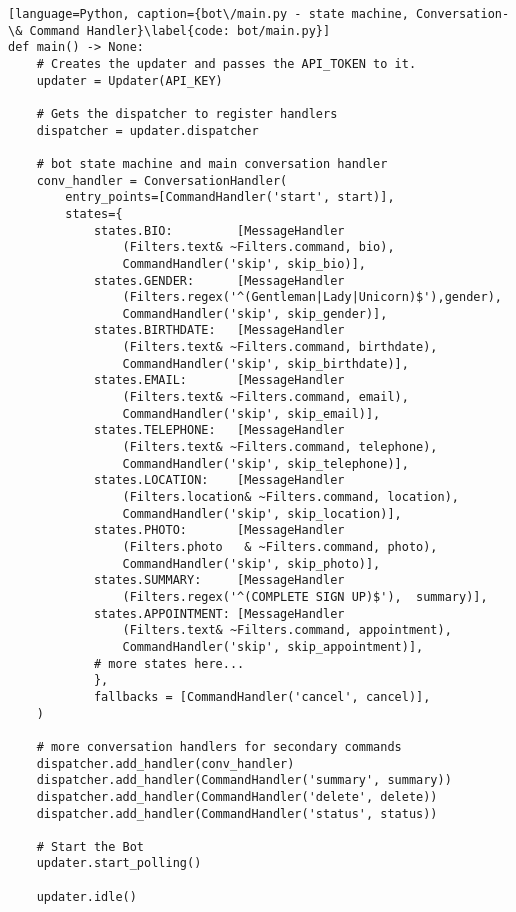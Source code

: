         \begin{lstlisting}[language=Python, caption={bot\/main.py - state machine, Conversation- \& Command Handler}\label{code: bot/main.py}]
def main() -> None:
    # Creates the updater and passes the API_TOKEN to it.
    updater = Updater(API_KEY)

    # Gets the dispatcher to register handlers
    dispatcher = updater.dispatcher

    # bot state machine and main conversation handler
    conv_handler = ConversationHandler(
        entry_points=[CommandHandler('start', start)],
        states={
            states.BIO:         [MessageHandler
                (Filters.text& ~Filters.command, bio), 
                CommandHandler('skip', skip_bio)],
            states.GENDER:      [MessageHandler
                (Filters.regex('^(Gentleman|Lady|Unicorn)$'),gender), 
                CommandHandler('skip', skip_gender)],
            states.BIRTHDATE:   [MessageHandler
                (Filters.text& ~Filters.command, birthdate), 
                CommandHandler('skip', skip_birthdate)],
            states.EMAIL:       [MessageHandler
                (Filters.text& ~Filters.command, email), 
                CommandHandler('skip', skip_email)],
            states.TELEPHONE:   [MessageHandler
                (Filters.text& ~Filters.command, telephone), 
                CommandHandler('skip', skip_telephone)],
            states.LOCATION:    [MessageHandler
                (Filters.location& ~Filters.command, location), 
                CommandHandler('skip', skip_location)],
            states.PHOTO:       [MessageHandler
                (Filters.photo   & ~Filters.command, photo), 
                CommandHandler('skip', skip_photo)],
            states.SUMMARY:     [MessageHandler
                (Filters.regex('^(COMPLETE SIGN UP)$'),  summary)],
            states.APPOINTMENT: [MessageHandler
                (Filters.text& ~Filters.command, appointment), 
                CommandHandler('skip', skip_appointment)],
            # more states here...
            },
            fallbacks = [CommandHandler('cancel', cancel)],
    )

    # more conversation handlers for secondary commands
    dispatcher.add_handler(conv_handler)
    dispatcher.add_handler(CommandHandler('summary', summary))
    dispatcher.add_handler(CommandHandler('delete', delete))
    dispatcher.add_handler(CommandHandler('status', status))

    # Start the Bot
    updater.start_polling()

    updater.idle()
        \end{lstlisting}

